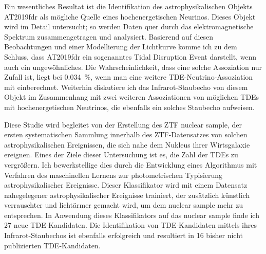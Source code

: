 Ein wesentliches Resultat ist die Identifikation des astrophysikalischen Objekts AT2019fdr als mögliche Quelle eines hochenergetischen Neurinos. Dieses Objekt wird im Detail untersucht; so werden Daten quer durch das elektromagnetische Spektrum zusammengetragen und analysiert. Basierend auf diesen Beobachtungen und einer Modellierung der Lichtkurve komme ich zu dem Schluss, dass AT2019fdr ein sogenanntes Tidal Disruption Event darstellt, wenn auch ein ungewöhnliches. Die Wahrscheinlichkeit, dass eine solche Assoziation nur Zufall ist, liegt bei \SI{0.034}{\percent}, wenn man eine weitere TDE-Neutrino-Assoziation mit einberechnet. Weiterhin diskutiere ich das Infrarot-Staubecho von diesem Objekt im Zusammenhang mit zwei weiteren Assoziationen von möglichen TDEs mit hochenergetischen Neutrinos, die ebenfalls ein solches Staubecho aufweisen.

Diese Studie wird begleitet von der Erstellung des ZTF nuclear sample, der ersten systematischen Sammlung innerhalb des ZTF-Datensatzes von solchen astrophysikalischen Ereignissen, die sich nahe dem Nukleus ihrer Wirtsgalaxie ereignen. Eines der Ziele dieser Untersuchung ist es, die Zahl der TDEs zu vergrößern. Ich bewerkstellige dies durch die Entwicklung eines Algorithmus mit Verfahren des maschinellen Lernens zur photometrischen Typisierung astrophysikalischer Ereignisse. Dieser Klassifikator wird mit einem Datensatz nahegelegener astrophysikalischer Ereignisse trainiert, der zusätzlich künstlich verrauschter und lichtärmer gemacht wird, um dem nuclear sample mehr zu entsprechen. In Anwendung dieses Klassifikators auf das nuclear sample finde ich 27 neue TDE-Kandidaten. Die Identifikation von TDE-Kandidaten mittels ihres Infrarot-Staubechos ist ebenfalls erfolgreich und resultiert in 16 bisher nicht publizierten TDE-Kandidaten.